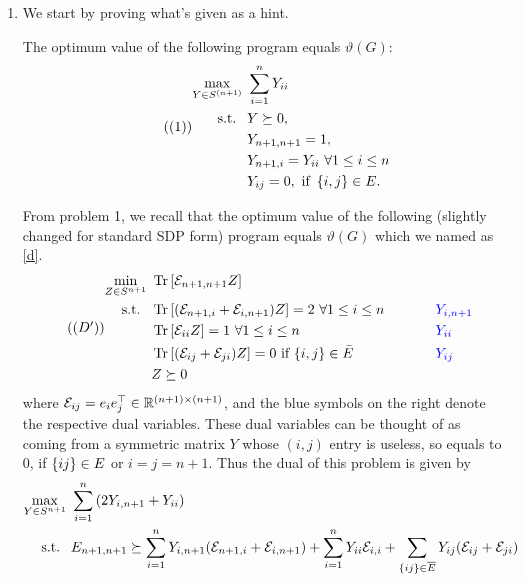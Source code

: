 \begin{enumerate}[leftmargin=*]
\item We start by proving what's given as a hint.
\begin{lemma}The optimum value of the following program equals $\vartheta(G)$:
\begin{equation}\tag{(1)}\label{g}\begin{aligned}
\max _{Y \in S^{(n+1)}} &~\sum_{i=1}^{n} Y_{i i} \\
\text { s.t. }&~ Y \succeq 0, \\
&~Y_{n+1, n+1}=1, \\
&~Y_{n+1, i}=Y_{i i}~\forall 1\le i \le n \\
&~Y_{i j}=0, \text { if }\left\{i, j\right\} \in E .
\end{aligned}\end{equation}
\end{lemma}
\begin{pf}
From problem 1, we recall that the optimum value of the following (slightly changed for standard SDP form) program equals $\vartheta (G)$ which we named as \ref{d}.
\begin{equation}\tag{($D'$)}\label{d}
\begin{aligned}
\min _{Z \in S^{n+1}}&~ 
\operatorname{Tr}\left[{\mathcal{E}}_{n+1,n+1}Z\right] \\
\text { s.t. } &~\operatorname{Tr}\left[({\mathcal{E}}_{n+1,i}+{\mathcal{E}}_{i,n+1})Z\right] = 2 ~\forall 1\le i\le n&& ~~~~~~~~{\color{blue}Y_{i,n+1}}\\
&~\operatorname{Tr}\left[{\mathcal{E}}_{ii}Z\right]=1 ~\forall 1\le i\le n  && ~~~~~~~~{\color{blue}Y_{ii}}\\
&~ \operatorname{Tr}\left[({\mathcal{E}}_{ij}+{\mathcal{E}}_{ji})Z\right] = 0 \text { if }\{i, j\} \in \bar{E} && ~~~~~~~~{\color{blue}Y_{ij}}\\
&~Z \succeq 0 
\end{aligned}
\end{equation}
where ${\mathcal{E}}_{ij} = e_{i}e_{j}^{\top}\in \mathbb{R}^{(n+1)\times(n+1)}$, and the blue symbols on the right denote the respective dual variables. These dual variables can be thought of as coming from a symmetric matrix $Y$ whose $(i,j)$ entry is useless, so equals to $0$, if $\left\{ij\right\}\in E$ or $i=j=n+1$. Thus the dual of this problem is given by 
\begin{align*}
\max _{Y \in S^{n+1}}&~ \sum_{i=1}^{n} \left(2Y_{i,n+1} + Y_{ii}\right)
 \\
\text { s.t. } &~ E_{n+1,n+1} \succeq \sum_{i=1}^{n} Y_{i,n+1}(\cE_{n+1,i}+\cE_{i,n+1}) + \sum_{i=1}^{n} Y_{ii}\cE_{i,i} + \sum_{\set{ij}\in \overline E} Y_{ij}(\cE_{ij}+\cE_{ji})

\end{align*}
\end{pf}
\end{enumerate}
